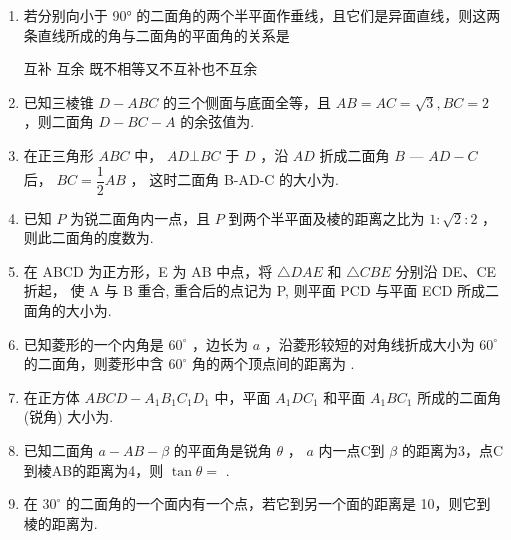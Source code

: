 \begin{enumerate}


\item 若分别向小于 90° 的二面角的两个半平面作垂线，且它们是异面直线，则这两条直线所成的角与二面角的平面角的关系是 

 {互补} {互余} {既不相等又不互补也不互余}



\item 已知三棱锥 $ D - {ABC} $ 的三个侧面与底面全等，且 $ {AB} = {AC} = \sqrt{3},{BC} = 2 $ ，则二面角 $ D - {BC} - A $ 的余弦值为.


\item 在正三角形 $ {ABC} $ 中， $ {AD}\bot {BC} $ 于 $ D $ ，沿 $ {AD} $ 折成二面角 $ B $ — $ {AD} - C $ 后， $ {BC} = \dfrac{1}{2}{AB} $ ， 这时二面角 B-AD-C 的大小为.


\item 已知 $ P $ 为锐二面角内一点，且 $ P $ 到两个半平面及棱的距离之比为 $ 1 : \sqrt{2} : 2 $ ，则此二面角的度数为.


\item 在 ABCD 为正方形，E 为 AB 中点，将 $ \bigtriangleup  {DAE} $ 和 $ \bigtriangleup  {CBE} $ 分别沿 DE、CE 折起， 使 A 与 B 重合, 重合后的点记为 P, 则平面 PCD 与平面 ECD 所成二面角的大小为.



\item 已知菱形的一个内角是 $ {60}^{ \circ  } $ ，边长为 $ a $ ，沿菱形较短的对角线折成大小为 $ {60}^{ \circ  } $ 的二面角，则菱形中含 $ {60}^{ \circ  } $ 角的两个顶点间的距离为
.


\item 在正方体 $ {{ABCD}} - {{A}}_{1}{{B}}_{1}{{C}}_{1}{{D}}_{1} $ 中，平面 $ {{A}}_{1}{{{DC}}}_{1} $ 和平面 $ {{A}}_{1}{{{BC}}}_{1} $ 所成的二面角 (锐角) 大小为.




\item 已知二面角 $ a - {AB} - \beta $ 的平面角是锐角 $ \theta $ ， $ a $ 内一点C到 $ \beta $ 的距离为3，点C 到棱AB的距离为4，则 $ \tan \theta  = $ .



\item 在 $30^\circ$ 的二面角的一个面内有一个点，若它到另一个面的距离是 10，则它到棱的距离为.




\end{enumerate}
